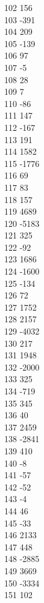 { 102	156 \\
 103	-391 \\
 104	209 \\
 105	-139 \\
 106	97 \\
 107	-5 \\
 108	28 \\
 109	7 \\
 110	-86 \\
 111	147 \\
 112	-167 \\
 113	191 \\
 114	1582 \\
 115	-1776 \\
 116	69 \\
 117	83 \\
 118	157 \\
 119	4689 \\
 120	-5183 \\
 121	325 \\
 122	-92 \\
 123	1686 \\
 124	-1600 \\
 125	-134 \\
 126	72 \\
 127	1752 \\
 128	2157 \\
 129	-4032 \\
 130	217 \\
 131	1948 \\
 132	-2000 \\
 133	325 \\
 134	-719 \\
 135	345 \\
 136	40 \\
 137	2459 \\
 138	-2841 \\
 139	410 \\
 140	-8 \\
 141	-57 \\
 142	-52 \\
 143	-4 \\
 144	46 \\
 145	-33 \\
 146	2133 \\
 147	448 \\
 148	-2885 \\
 149	3669 \\
 150	-3334 \\
 151	102 \\
}
